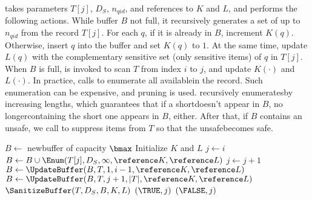 \Enum takes parameters $T[j]$, $D_S$, $n_{qid}$, and references to $K$ and $L$, 
and performs the following
actions. While buffer $B$ not full, it recursively generates a set of 
up to $n_{qid}$ \qids from the record $T[j]$.
For each $q$, if it is already in $B$, increment $K(q)$.
Otherwise, insert $q$ into the buffer and set $K(q)$ to $1$.
At the same time, update $L(q)$ with the complementary sensitive set
(only sensitive items) of $q$ in $T[j]$.
When $B$ is full, \UpdateBuffer is invoked to scan $T$ from index $i$ to $j$, 
and update $K(\cdot)$ and $L(\cdot)$. 
In practice, \UpdateBuffer calls \Enum to 
enumerate all available\qids in the record.
Such enumeration can be expensive, and pruning is used. 
\Enum recursively enumerates\qids by increasing lengths,
which guarantees that if a short\qid doesn't appear in $B$,
no longer\qids containing the short one appears in $B$, either.
After that, if $B$ contains an unsafe\qidx, 
we call \SanitizeBuffer to suppress items from $T$ so that the 
unsafe\qid becomes safe.
\begin{algorithm}[th]
\caption{$\HandleShortRecords(\reference T, D_S, i, \bmax)$}
\label{algo:handleshort}
\begin{algorithmic}[1]
    \STATE $B\leftarrow$ new\qid buffer of capacity $\bmax$
    \STATE Initialize $K$ and $L$
    \STATE $j\leftarrow i$
        \STATE $B\leftarrow B\cup\Enum(T[j], D_S, \infty, \reference K, \reference L)$
        \STATE $j\leftarrow j+1$
    \ENDWHILE
    \STATE $B\leftarrow\UpdateBuffer(B,T,1,i-1, \reference K, \reference L)$
    \STATE $B\leftarrow\UpdateBuffer(B,T,j+1,|T|, \reference K, \reference L)$
     \label{line:handle-short-if-contains-unsafe}
        \STATE $\SanitizeBuffer(T, D_S, B, K, L)$
        \STATE \RETURN $(\TRUE,j)$
    \ELSE
        \STATE \RETURN $(\FALSE,j)$ \label{line:handle-short-return-false}
    \ENDIF
\end{algorithmic}
\end{algorithm}


